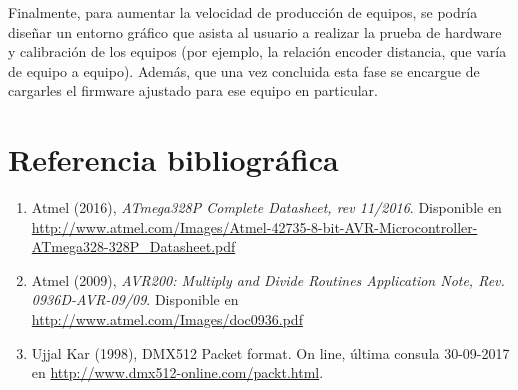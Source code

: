 Finalmente, para aumentar la velocidad de producción de equipos, se podría diseñar un entorno gráfico que asista al usuario a realizar la prueba de hardware y calibración de los equipos (por ejemplo, la relación encoder distancia, que varía de equipo a equipo). Además, que una vez concluida esta fase se encargue de cargarles el firmware ajustado para ese equipo en particular.


\section{Referencia bibliográfica} \label{sec:\thesection}

\begin{enumerate}
	\item Atmel (2016), \textit{ATmega328P Complete Datasheet, rev 11/2016}. Disponible en \href{http://www.atmel.com/Images/Atmel-42735-8-bit-AVR-Microcontroller-ATmega328-328P_Datasheet.pdf}{http://www.atmel.com/Images/Atmel-42735-8-bit-AVR-Microcontroller-ATmega328-328P\_Datasheet.pdf}
	\item Atmel (2009), \textit{AVR200: Multiply and Divide Routines Application Note, Rev. 0936D-AVR-09/09}. Disponible en \href{http://www.atmel.com/Images/doc0936.pdf}{http://www.atmel.com/Images/doc0936.pdf}
	\item Ujjal Kar (1998), DMX512 Packet format. On line, última consula 30-09-2017 en \href{http://www.dmx512-online.com/packt.html}{http://www.dmx512-online.com/packt.html}.
\end{enumerate}

